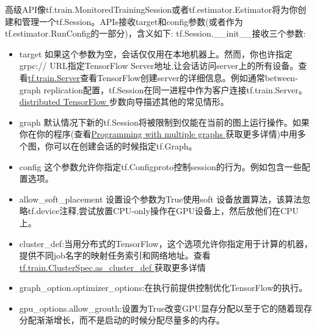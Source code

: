 高级API像tf.train.MonitoredTrainingSession或者tf.estimator.Estimator将为你创建和管理一个tf.Session。APIs接收target和config参数(或者作为tf.estimator.RunConfig的一部分)，含义如下:
tf.Session.\_\_init\_\_接收三个参数:
\begin{itemize}
	\item target 如果这个参数为空，会话仅仅用在本地机器上。然而，你也许指定grpc:// URL指定TensorFlow Server地址,让会话访问server上的所有设备。查看\href{https://www.tensorflow.org/api_docs/python/tf/train/Server?hl=zh-cn}{tf.train.Server}查看TensorFlow创建server的详细信息。例如通常between-graph replication配置，tf.Session在同一进程中作为客户连接tf.train.Server。\href{https://www.tensorflow.org/deploy/distributed?hl=zh-cn}{ distributed TensorFlow }步数向导描述其他的常见情形。
	\item graph 默认情况下新的tf.Session将被限制到仅能在当前的图上运行操作。如果你在你的程序(查看\href{https://www.tensorflow.org/programmers_guide/programming-with-multiple-graphs?hl=zh-cn}{Programming with multiple graphs }获取更多详情)中用多个图，你可以在创建会话的时候指定tf.Graph。
	\item config 这个参数允许你指定tf.Configproto控制session的行为。例如包含一些配置选项。
	\item allow\_soft\_placement 设置设个参数为True使用soft 设备放置算法，该算法忽略tf.device注释,尝试放置CPU-only操作在GPU设备上，然后放他们在CPU上。
	\item cluster\_def:当用分布式的TensorFlow，这个选项允许你指定用于计算的机器，提供不同job名字的映射任务索引和网络地址。查看\href{https://www.tensorflow.org/api_docs/python/tf/train/ClusterSpec?hl=zh-cn#as_cluster_def}{ tf.train.ClusterSpec.as\_cluster\_def }获取更多详情
	\item graph\_option.optimizer\_options:在执行前提供控制优化TensorFlow的执行。
	\item gpu\_options.allow\_grouth:设置为True改变GPU显存分配以至于它的随着现存分配渐渐增长，而不是启动的时候分配尽量多的内存。
\end{itemize}
